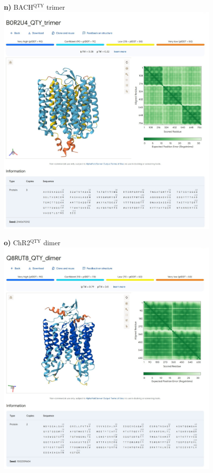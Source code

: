 \documentclass[fleqn,12pt]{supp}
\begin{document}
\newpage
\begin{figure}[H]
    \textbf{n)} BACH$^{\textrm{QTY}}$ trimer \\
    \includegraphics[width=\linewidth]{SuppFigures/af3 bach qty tri.jpg}
\end{figure}

\newpage
\begin{figure}[H]
    \textbf{o)} ChR2$^{\textrm{QTY}}$ dimer \\
    \includegraphics[width=\linewidth]{SuppFigures/af3 chr2 qty di.jpg}
\end{figure}
\end{document}
